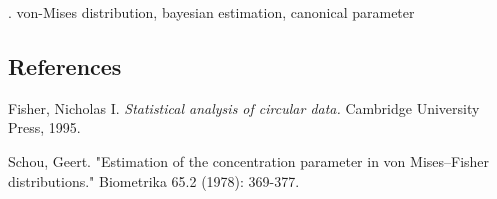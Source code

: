 \documentclass[12pt]{article}
\begin{document}
\vskip 2mm

.
von-Mises distribution, bayesian estimation, canonical parameter


%        
%
%        

\subsection*{References}

\begin{description}

\item
Fisher, Nicholas I. {\it Statistical analysis of circular data.} Cambridge University Press, 1995.

\item
Schou, Geert. "Estimation of the concentration parameter in von Mises–Fisher distributions." Biometrika 65.2 (1978): 369-377.
\end{description}
\end{document}
